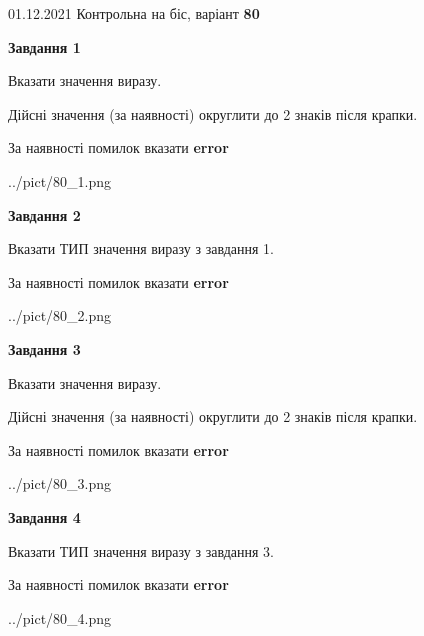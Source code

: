 \documentclass[11pt, ukrainian]{article}
\begin{document}
{01.12.2021 Контрольна на біс, варіант  \No \textbf { 80 }\par}
{
\begin {large}
{\begin {center}\textbf{Завдання 1}\end {center}}\par
Вказати значення виразу. \par
Дійсні значення (за наявності) округлити до 2 знаків після крапки. \par
За наявності помилок вказати \textbf{error}

\begin{center}
	{../pict/80_1.png}
\end{center}
\newpage

{\begin {center}\textbf{Завдання 2}\end {center}}\par
Вказати ТИП значення виразу з завдання 1. \par
За наявності помилок вказати \textbf{error}

\begin{center}
	{../pict/80_2.png}
\end{center}
\newpage

{\begin {center}\textbf{Завдання 3}\end {center}}\par
Вказати значення виразу. \par
Дійсні значення (за наявності) округлити до 2 знаків після крапки. \par
За наявності помилок вказати \textbf{error}

\begin{center}
	{../pict/80_3.png}
\end{center}
\newpage

{\begin {center}\textbf{Завдання 4}\end {center}}\par
Вказати ТИП значення виразу з завдання 3. \par
За наявності помилок вказати \textbf{error}

\begin{center}
	{../pict/80_4.png}
\end{center}
\newpage


\end{large}}
\end{document}
